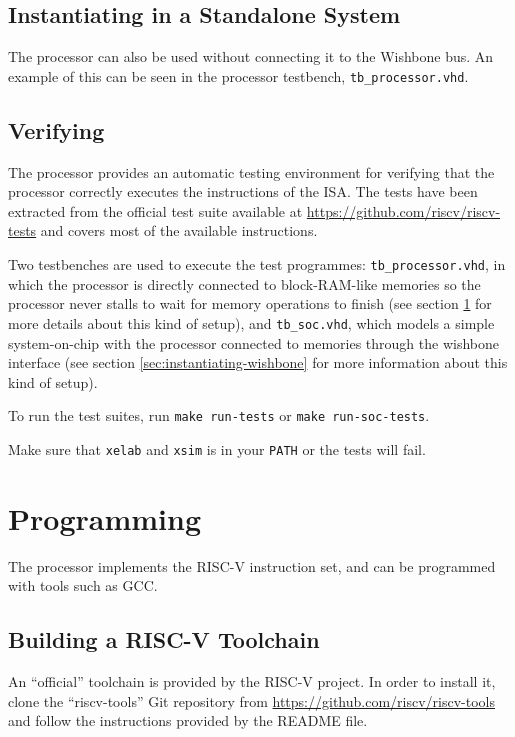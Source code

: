 \documentclass[12pt,a4paper]{report}
\begin{document}
\FloatBarrier

\section{Instantiating in a Standalone System}
\label{sec:instantiating-standalone}

The processor can also be used without connecting it to the Wishbone bus. An example
of this can be seen in the processor testbench, \texttt{tb\_processor.vhd}.

\section{Verifying}

The processor provides an automatic testing environment for verifying that the processor
correctly executes the instructions of the ISA. The tests have been extracted from the
official test suite available at \url{https://github.com/riscv/riscv-tests} and covers
most of the available instructions.

Two testbenches are used to execute the test programmes: \texttt{tb\_processor.vhd}, in
which the processor is directly connected to block-RAM-like memories so the processor
never stalls to wait for memory operations to finish (see section \ref{sec:instantiating-standalone}
for more details about this kind of setup), and \texttt{tb\_soc.vhd}, which models a
simple system-on-chip with the processor connected to memories through the
wishbone interface (see section \ref{sec:instantiating-wishbone} for more information
about this kind of setup).

To run the test suites, run \texttt{make run-tests} or \texttt{make run-soc-tests}.

Make sure that \texttt{xelab} and \texttt{xsim} is in your \texttt{PATH} or the
tests will fail.

\chapter{Programming}

The processor implements the RISC-V instruction set, and can be programmed with tools
such as GCC.

\section{Building a RISC-V Toolchain}
\label{sec:toolchain}

An ``official'' toolchain is provided by the RISC-V project. In order to install it, clone
the ``riscv-tools'' Git repository from \url{https://github.com/riscv/riscv-tools} and follow
the instructions provided by the README file.
\end{document}
